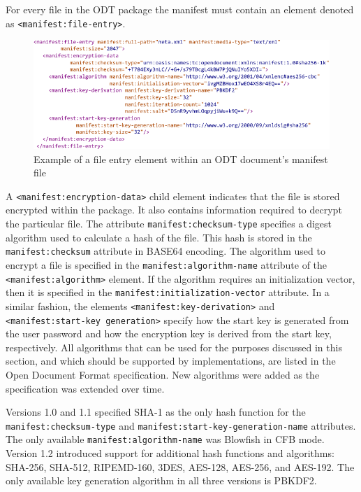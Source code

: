 \documentclass[11pt,oneside]{fithesis2}
\begin{document}
For every file in the ODT package the manifest must contain an element denoted as \texttt{<manifest:file-entry>}.

\begin{figure}[ht]
	\centering
	\includegraphics[width=1\textwidth]{figures/manifest_snippet.pdf}
	\caption{Example of a file entry element within an ODT document's manifest file}
	\label{manifest_snippet}
\end{figure}

A \texttt{<manifest:encryption-data>} child element indicates that the file is stored encrypted within the package. It also contains information required to decrypt the particular file. The attribute \texttt{manifest:checksum-type} specifies a digest algorithm used to calculate a hash of the file. This hash is stored in the \texttt{manifest:checksum} attribute in BASE64 encoding. 
The algorithm used to encrypt a file is specified in the \texttt{manifest:algorithm-name} attribute of the \texttt{<manifest:algorithm>} element. If the algorithm requires an initialization vector, then it is specified in the \texttt{manifest:initialization-vector} attribute.
In a similar fashion, the elements \texttt{<manifest:key-derivation>} and \texttt{<manifest:start-key generation>} specify how the start key is generated from the user password and how the encryption key is derived from the start key, respectively.
All algorithms that can be used for the purposes discussed in this section, and which should be supported by implementations, are listed in the Open Document Format specification. New algorithms were added as the specification was extended over time. 

Versions 1.0 and 1.1 specified SHA-1 as the only hash function for the \texttt{manifest:checksum-type} and \texttt{manifest:start-key-generation-name} attributes. The only available \texttt{manifest:algorithm-name} was Blowfish in CFB mode. Version 1.2 introduced support for additional hash functions and algorithms: SHA-256, SHA-512, RIPEMD-160, 3DES, AES-128, AES-256, and AES-192. The only available key generation algorithm in all three versions is PBKDF2.
\end{document}
